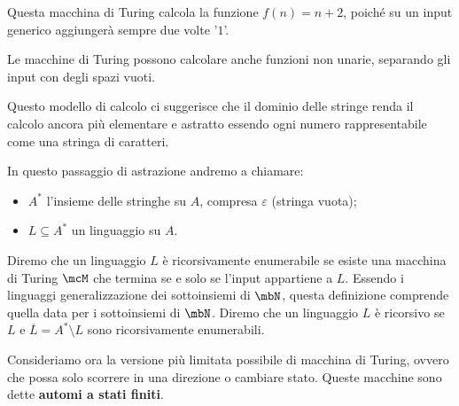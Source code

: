 \begin{figure}[ht]
{
    }
\end{figure}

Questa macchina di Turing calcola la funzione \(f(n) = n+2\), poiché su un input generico aggiungerà sempre due volte '\(1\)'.

Le macchine di Turing possono calcolare anche funzioni non unarie, separando gli input con degli spazi vuoti.

Questo modello di calcolo ci suggerisce che il dominio delle stringe renda il calcolo ancora più elementare e astratto essendo ogni numero rappresentabile come una stringa di caratteri.

In questo passaggio di astrazione andremo a chiamare:
\begin{itemize}
  \item \(A^*\) l'insieme delle stringhe su \(A\), compresa \(\varepsilon\) (stringa vuota);
  \item \(L \subseteq A^*\) un linguaggio su \(A\).
\end{itemize}

Diremo che un linguaggio \(L\) è ricorsivamente enumerabile se esiste una macchina di Turing \(\mcM\) che termina se e solo se l'input appartiene a \(L\).
Essendo i linguaggi generalizzazione dei sottoinsiemi di \(\mbN\), questa definizione comprende quella data per i sottoinsiemi di \(\mbN\).
Diremo che un linguaggio \(L\) è ricorsivo se \(L\) e \(\overline{L}=A^* \setminus L\) sono ricorsivamente enumerabili.

Consideriamo ora la versione più limitata possibile di macchina di Turing, ovvero che possa solo scorrere in una direzione o cambiare stato. Queste macchine sono dette \textbf{automi a stati finiti}.

